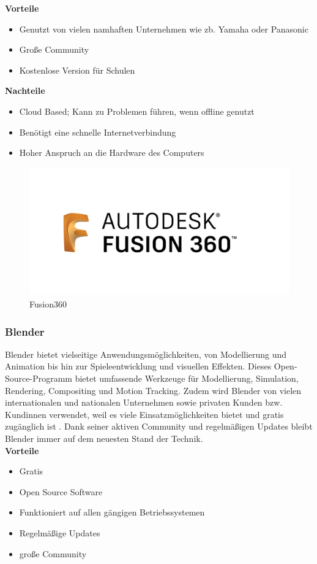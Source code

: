 \textbf{Vorteile}
\begin{itemize}
	\item Genutzt von vielen namhaften Unternehmen wie zb. Yamaha oder Panasonic
	\item Große Community
	\item Kostenlose Version für Schulen \parencite{AutodeskFusionReviews}
\end{itemize} 

\textbf{Nachteile}
\begin{itemize}
	\item Cloud Based; Kann zu Problemen führen, wenn offline genutzt 
	\item Benötigt eine schnelle Internetverbindung
	\item Hoher Anspruch an die Hardware des Computers \parencite{AutodeskFusionReviews}
\end{itemize}

\begin{figure}[H]
	\centering
	\includegraphics[width=0.3\linewidth]{images/Fusion360.png}
	\caption[Fusion360]{Fusion360}
	\label{fig:Autodesk Fusion}
\end{figure}



\subsubsection{Blender} 
Blender bietet vielseitige Anwendungsmöglichkeiten, von Modellierung und Animation bis hin zur Spieleentwicklung und visuellen Effekten. Dieses Open-Source-Programm bietet umfassende Werkzeuge für Modellierung, Simulation, Rendering, Compositing und Motion Tracking. Zudem wird Blender von vielen internationalen und nationalen Unternehmen sowie privaten Kunden bzw. Kundinnen verwendet, weil es viele Einsatzmöglichkeiten bietet und gratis zugänglich ist \parencite{Blender}. Dank seiner aktiven Community und regelmäßigen Updates bleibt Blender immer auf dem neuesten Stand der Technik. \\


\textbf{Vorteile}
\begin{itemize}
	\item Gratis 
	\item Open Source Software
	\item Funktioniert auf allen gängigen Betriebssystemen
	\item Regelmäßige Updates
	\item große Community \parencite{BlenderProsUndCons}
\end{itemize}

